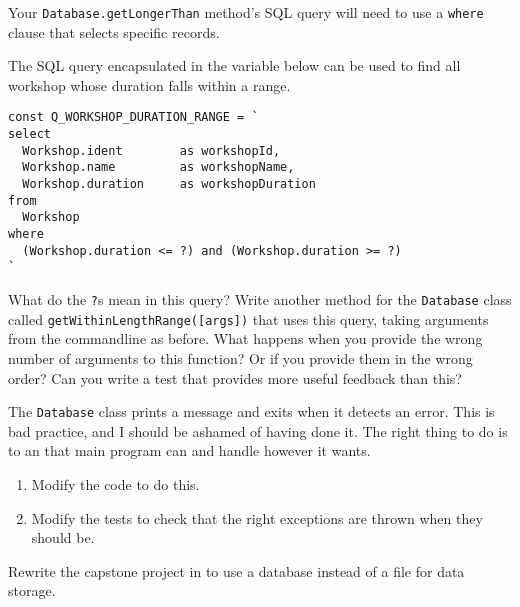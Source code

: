 Your \texttt{Database.getLongerThan} method's SQL query
will need to use a \texttt{where} clause
that selects specific records.


The SQL query encapsulated in the variable below can be used to
find all workshop whose duration falls within a range.

\begin{verbatim}
const Q_WORKSHOP_DURATION_RANGE = `
select
  Workshop.ident        as workshopId,
  Workshop.name         as workshopName,
  Workshop.duration     as workshopDuration
from
  Workshop
where
  (Workshop.duration <= ?) and (Workshop.duration >= ?)
`
\end{verbatim}

What do the \texttt{?}s mean in this query?
Write another method for the \texttt{Database} class called \texttt{getWithinLengthRange([args])}
that uses this query, taking arguments from the commandline as before.
What happens when you provide the wrong number of arguments to this function? Or
if you provide them in the wrong order?
Can you write a test that provides more useful feedback than this?


The \texttt{Database} class prints a message and exits when it detects an error.
This is bad practice,
and I should be ashamed of having done it.
The right thing to do is to 
an 
that main program can 
and handle however it wants.

\begin{enumerate}
\item
  Modify the code to do this.
\item
  Modify the tests to check that the right exceptions are thrown when they should be.
\end{enumerate}


Rewrite the capstone project in  to use a database instead of a file for data storage.
